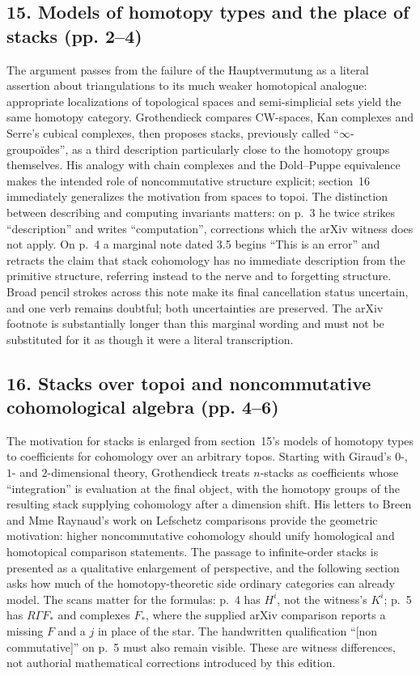 \documentclass[10pt,oneside]{book}
\begin{document}
\subsection*{15. Models of homotopy types and the place of stacks (pp. 2--4)}
The argument passes from the failure of the Hauptvermutung as a literal assertion about triangulations to its much weaker homotopical analogue: appropriate localizations of topological spaces and semi-simplicial sets yield the same homotopy category. Grothendieck compares CW-spaces, Kan complexes and Serre's cubical complexes, then proposes stacks, previously called ``$\infty$-groupoïdes'', as a third description particularly close to the homotopy groups themselves. His analogy with chain complexes and the Dold--Puppe equivalence makes the intended role of noncommutative structure explicit; section~16 immediately generalizes the motivation from spaces to topoi. The distinction between describing and computing invariants matters: on p.~3 he twice strikes ``description'' and writes ``computation'', corrections which the arXiv witness does not apply. On p.~4 a marginal note dated 3.5 begins ``This is an error'' and retracts the claim that stack cohomology has no immediate description from the primitive structure, referring instead to the nerve and to forgetting structure. Broad pencil strokes across this note make its final cancellation status uncertain, and one verb remains doubtful; both uncertainties are preserved. The arXiv footnote is substantially longer than this marginal wording and must not be substituted for it as though it were a literal transcription.

\subsection*{16. Stacks over topoi and noncommutative cohomological algebra (pp. 4--6)}
The motivation for stacks is enlarged from section~15's models of homotopy types to coefficients for cohomology over an arbitrary topos. Starting with Giraud's $0$-, $1$- and $2$-dimensional theory, Grothendieck treats $n$-stacks as coefficients whose ``integration'' is evaluation at the final object, with the homotopy groups of the resulting stack supplying cohomology after a dimension shift. His letters to Breen and Mme Raynaud's work on Lefschetz comparisons provide the geometric motivation: higher noncommutative cohomology should unify homological and homotopical comparison statements. The passage to infinite-order stacks is presented as a qualitative enlargement of perspective, and the following section asks how much of the homotopy-theoretic side ordinary categories can already model. The scans matter for the formulas: p.~4 has $H^i$, not the witness's $K^i$; p.~5 has $R\Gamma F_*$ and complexes $F_*$, where the supplied arXiv comparison reports a missing $F$ and a $j$ in place of the star. The handwritten qualification ``[non commutative]'' on p.~5 must also remain visible. These are witness differences, not authorial mathematical corrections introduced by this edition.
\end{document}
